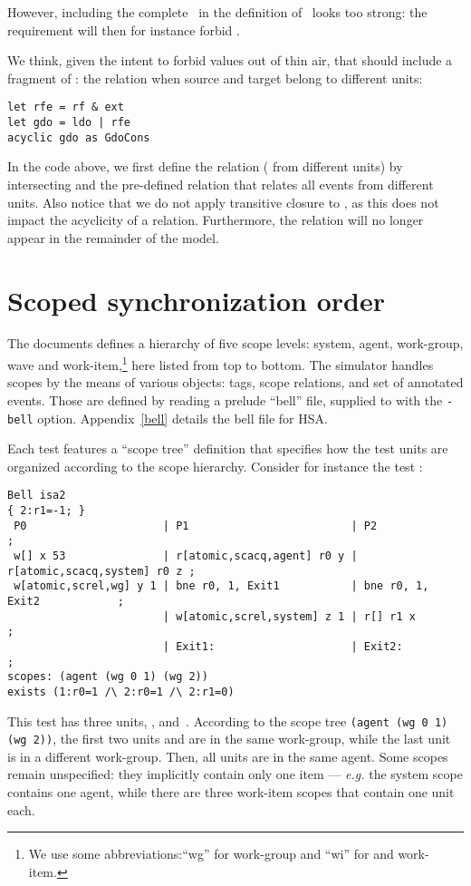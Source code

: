 \documentclass[a4paper]{article}
\begin{document}
However, including the complete~\coh{} in the definition of~\gdo{} looks too
strong: the requirement will then for instance forbid .
\begin{center}\hspace*{-2cm}\end{center}

We  think, given the intent to forbid values out of thin air,
that \gdo{} should include a fragment of \coh{}: the \rf{} relation
when source and target belong to different units:
\begin{verbatim}
let rfe = rf & ext
let gdo = ldo | rfe
acyclic gdo as GdoCons
\end{verbatim}
In the code above, we first define the \rfe{} relation (\rf{} from different
units) by intersecting \rf{} and the pre-defined \ext{} relation that relates
all events from different units.
Also notice that we do not apply transitive closure to \gdo{}, as this
does not impact the acyclicity of a relation. Furthermore,
the \gdo{} relation will no longer appear in the remainder of the model.


\section{\label{sso}Scoped synchronization order}
The documents defines a hierarchy of five scope levels:
system, agent, work-group, wave and work-item,\footnote{We use some abbreviations:``wg'' for work-group and ``wi'' for and work-item.}
here listed from top to bottom.
The \herd{} simulator handles scopes by the means
of various objects: tags, scope relations,
and set of annotated events.
Those are defined by reading a prelude ``bell'' file,
supplied to \herd{} with the \texttt{-bell} option.
Appendix~\ref{bell} details the bell file for HSA.

Each test features a ``scope tree'' definition that specifies how
the test  units are organized according to the scope hierarchy.
Consider for instance the test :
{\small
\begin{verbatim}
Bell isa2
{ 2:r1=-1; }
 P0                     | P1                         | P2                          ;
 w[] x 53               | r[atomic,scacq,agent] r0 y | r[atomic,scacq,system] r0 z ;
 w[atomic,screl,wg] y 1 | bne r0, 1, Exit1           | bne r0, 1, Exit2            ;
                        | w[atomic,screl,system] z 1 | r[] r1 x                    ;
                        | Exit1:                     | Exit2:                      ;
scopes: (agent (wg 0 1) (wg 2))
exists (1:r0=1 /\ 2:r0=1 /\ 2:r1=0)
\end{verbatim}
}
This test has three units, ,  and~.
According to the scope tree \verb+(agent (wg 0 1) (wg 2))+,
the first two units  and  are in the same work-group,
while the last unit~ is in a different work-group.
Then, all units are in the same agent.
Some scopes remain unspecified: they implicitly contain only one
item --- \emph{e.g.} the system scope contains one agent, while
there are three work-item scopes that contain one unit each.
\end{document}
